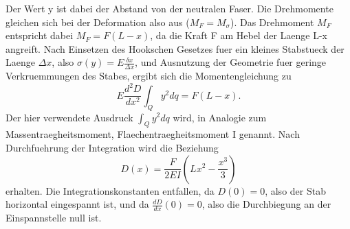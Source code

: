 Der Wert y ist dabei der Abstand von der neutralen Faser. Die Drehmomente gleichen sich bei der Deformation also aus ($M_F=M_{\sigma}$). Das Drehmoment $M_F$ entspricht dabei $M_F=F(L-x)$, da die Kraft F am Hebel der Laenge L-x angreift. Nach Einsetzen des Hookschen Gesetzes fuer ein kleines Stabstueck der Laenge $\Delta x$, also $\sigma(y)=E\frac{\delta x}{\Delta x}$, und Ausnutzung der Geometrie fuer geringe Verkruemmungen des Stabes, ergibt sich die Momentengleichung zu 
\begin{equation}
    E\frac{d^2D}{dx^2}\int_Qy^2dq = F(L-x).
\end{equation}
Der hier verwendete Ausdruck $\int_Qy^2dq$ wird, in Analogie zum Massentraegheitsmoment, Flaechentraegheitsmoment I genannt. Nach Durchfuehrung der Integration wird die Beziehung 
\begin{equation}
    D(x)=\frac{F}{2EI}(Lx^2-\frac{x^3}{3})
\end{equation}
erhalten. Die Integrationskonstanten entfallen, da $D(0)=0$, also der Stab horizontal eingespannt ist, und da $\frac{dD}{dx}(0)=0$, also die Durchbiegung an der Einspannstelle null ist.
